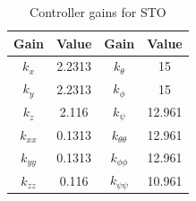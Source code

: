 \documentclass[letterpaper%
, twoside%
, 12pt%
,memoire%
, english%
,creativecommons,hyperref%
]{thETS}
\theoremstyle{newThmStyle}
\begin{document}
\begin{table}
\parbox{0.65\textwidth}{\caption{Controller gains for STO}\label{Tab:realControllerGainsSTO}} 
\begin{tabular}{|c|c|c|c|}
\hline
{\bf Gain} & {\bf Value} & {\bf Gain}         & {\bf Value}  \\ \hline
$k_x$      & 2.2313      & $k_\theta$         & 15           \\ \hline
$k_y$      & 2.2313      & $k_\phi$           & 15           \\ \hline
$k_z$      & 2.116       & $k_\psi$           & 12.961       \\ \hline 
$k_{xx}$   & 0.1313      & $k_{\theta\theta}$ & 12.961       \\ \hline
$k_{yy}$   & 0.1313      & $k_{\phi\phi}$     & 12.961       \\ \hline
$k_{zz}$   & 0.116       & $k_{\psi\psi}$     & 10.961       \\ \hline 
\end{tabular}
\end{table}
\end{document}
